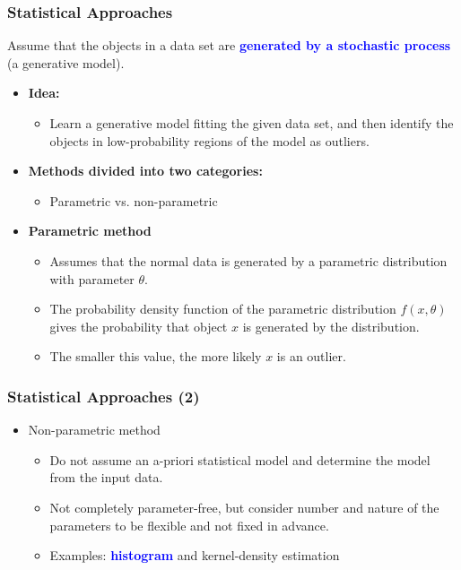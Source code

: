 \documentclass[aspectratio=169,t,xcolor=dvipsnames]{beamer}
\newcommand{\blue}[1]{\textbf{\textcolor{blue}{#1}}}
\begin{document}
%

\begin{frame}
	\frametitle{Statistical Approaches}
	Assume that the objects in a data set are \blue{generated by a stochastic process} (a generative model).
	\begin{itemize}
	\item \textbf{Idea:}
	\begin{itemize}
		\item Learn a generative model fitting the given data set, and then identify the objects in low-probability regions of the model as outliers.
	\end{itemize}
	\item \textbf{Methods divided into two categories:}
	\begin{itemize}
		\item Parametric vs. non-parametric
	\end{itemize}
	\item \textbf{Parametric method}
	\begin{itemize}
		\item Assumes that the normal data is generated by a parametric distribution with parameter \textbf{\alert{$\theta$}}.
		\item The probability density function of the parametric distribution \textbf{\alert{$f(x, \theta)$}} gives the probability that object \alert{$x$} is generated by the distribution.
		\item The smaller this value, the more likely $x$ is an outlier.
	\end{itemize}
	\end{itemize}
	
\end{frame}

%

\begin{frame}
  \frametitle{Statistical Approaches (2)}
  \begin{itemize}
    \item Non-parametric method
          \begin{itemize}
            \item Do not assume an a-priori statistical model
                  and determine the model from the input data.
            \item Not completely parameter-free,
                  but consider number and nature of the parameters to be flexible and not fixed in advance.
            \item Examples: \blue{histogram} and kernel-density estimation
          \end{itemize}
  \end{itemize}
\end{frame}
\end{document}

